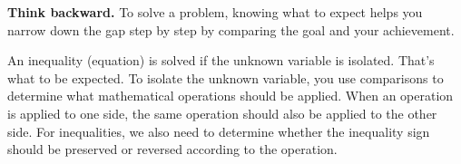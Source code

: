 \begin{center}
\begin{tabular}{
		>{\centering\arraybackslash}m{}|
		>{\centering\arraybackslash}m{}|
		>{\centering\arraybackslash}m{}|
		>{\centering\arraybackslash}m{}
		}
		\bottomrule
	\end{tabular}
\end{center}


\begin{trick}
\textbf{Think backward.} To solve a problem, knowing what to expect helps you narrow down the gap step by step by comparing the goal and your achievement.

An inequality (equation) is solved if the unknown variable is isolated. That's what to be expected. To isolate the unknown variable, you use comparisons to determine what mathematical operations should be applied. When an operation is applied to one side, the same operation should also be applied to the other side. For inequalities, we also need to determine whether the inequality sign should be preserved or reversed according to the operation.
\end{trick}

\newpage

